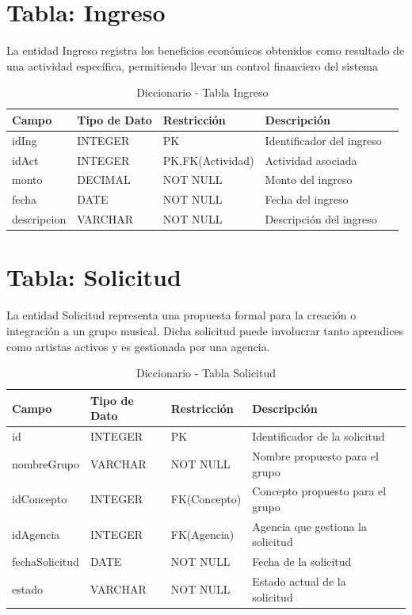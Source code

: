 \documentclass[12pt,a4paper,spanish,oneside]{report}
\begin{document}
\section{Tabla: Ingreso}
La entidad Ingreso registra los beneficios económicos obtenidos como resultado de una actividad específica, permitiendo llevar un control financiero del sistema
\begin{table}[H]
\centering
\caption{Diccionario - Tabla Ingreso}
\begin{tabular}{|l|l|l|l|l|}
\hline
\textbf{Campo} & \textbf{Tipo de Dato} & \textbf{Restricción} & \textbf{Descripción} \\
\hline
idIng & INTEGER & PK & Identificador del ingreso \\
\hline
idAct & INTEGER & PK,FK(Actividad)& Actividad asociada \\
\hline
monto & DECIMAL & NOT NULL & Monto del ingreso \\
\hline
fecha & DATE & NOT NULL & Fecha del ingreso \\
\hline
descripcion & VARCHAR & NOT NULL & Descripción del ingreso \\
\hline
\end{tabular}
\end{table}

\section{Tabla: Solicitud}
La entidad Solicitud representa una propuesta formal para la creación o integración a
un grupo musical. Dicha solicitud puede involucrar tanto aprendices como artistas activos
y es gestionada por una agencia.
\begin{table}[H]
\centering
\caption{Diccionario - Tabla Solicitud}
\begin{tabular}{|l|l|l|l|l|}
\hline
\textbf{Campo} & \textbf{Tipo de Dato} & \textbf{Restricción} & \textbf{Descripción} \\
\hline
id & INTEGER & PK & Identificador de la solicitud \\
\hline
nombreGrupo & VARCHAR & NOT NULL & Nombre propuesto para el grupo \\
\hline
idConcepto & INTEGER & FK(Concepto) & Concepto propuesto para el grupo \\
\hline
idAgencia & INTEGER & FK(Agencia) & Agencia que gestiona la solicitud \\
\hline
fechaSolicitud & DATE & NOT NULL & Fecha de la solicitud \\
\hline
estado & VARCHAR & NOT NULL & Estado actual de la solicitud \\
\hline
\end{tabular}
\end{table}
\end{document}
